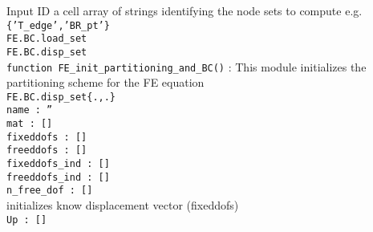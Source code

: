 \documentclass{article}
\newcommand{\code}[1]{\colorbox{light-gray}{\texttt{#1}}}
\begin{document}
Input ID a cell array of strings identifying the node sets to compute e.g. \code{\{'T\_edge','BR\_pt'\}}\\
\indent\indent\code{FE.BC.load\_set} \\
\indent\indent\code{FE.BC.disp\_set} \\
\indent\code{function FE\_init\_partitioning\_and\_BC()} : This module initializes the partitioning scheme for the FE equation\\
\indent\indent\code{FE.BC.disp\_set\{.,.\}}\\
\indent\indent\indent \code{name : ''}\\
\indent\indent\indent \code{mat : []}\\
\indent\indent\indent \code{fixeddofs : []}\\
\indent\indent\indent \code{freeddofs : []}\\
\indent\indent\indent \code{fixeddofs\_ind : []}\\
\indent\indent\indent \code{freeddofs\_ind : []}\\
\indent\indent\indent \code{n\_free\_dof : []}\\
\indent\indent\indent initializes know displacement vector (fixeddofs) \\
\indent\indent\indent \code{Up : []}\\
\end{document}
